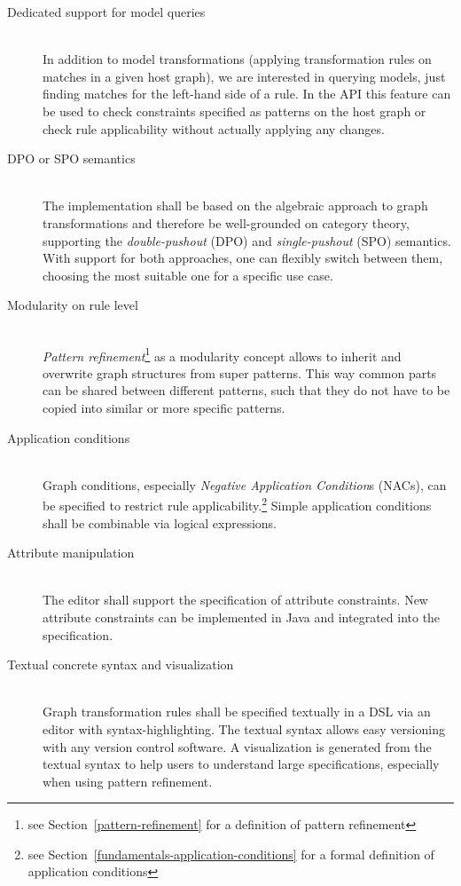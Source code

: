 \begin{description}
	\item[Dedicated support for model queries] ~\\
		In addition to model transformations (\ie applying transformation rules on matches in a given host graph), we are interested in querying models, \ie just finding matches for the left-hand side of a rule.
		In the API this feature can be used to check constraints specified as patterns on the host graph or check rule applicability without actually applying any changes.

	\item[DPO or SPO semantics] ~\\
		The implementation shall be based on the algebraic approach to graph transformations and therefore be well-grounded on category theory, \eg supporting the \textit{double-pushout} (DPO) and \textit{single-pushout} (SPO) semantics.
		With support for both approaches, one can flexibly switch between them, choosing the most suitable one for a specific use case.

	\item[Modularity on rule level] ~\\
		\textit{Pattern refinement}\footnote{see Section~\ref{pattern-refinement} for a definition of pattern refinement} as a modularity concept allows to inherit and overwrite graph structures from super patterns.
		This way common parts can be shared between different patterns, such that they do not have to be copied into similar or more specific patterns.

	\item[Application conditions] ~\\
		Graph conditions, especially \textit{Negative Application Condition}s (NACs), can be specified to restrict rule applicability.\footnote{see Section~\ref{fundamentals-application-conditions} for a formal definition of application conditions}
		Simple application conditions shall be combinable via logical expressions.

	\item[Attribute manipulation] ~\\
		The editor shall support the specification of attribute constraints.
		New attribute constraints can be implemented in Java and integrated into the specification.

	\item[Textual concrete syntax and visualization] ~\\
		Graph transformation rules shall be specified textually in a DSL via an editor with syntax-highlighting.
		The textual syntax allows easy versioning with any version control software.
		A visualization is generated from the textual syntax to help users to understand large specifications, especially when using pattern refinement.


\end{description}
